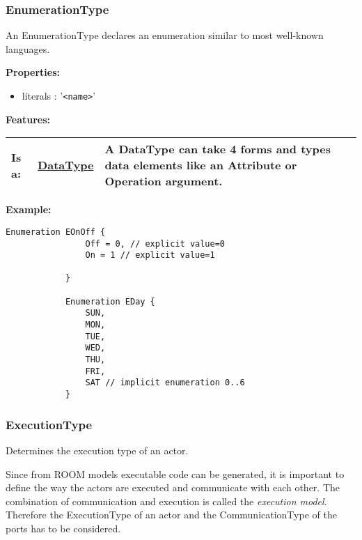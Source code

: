		
	\vspace{\baselineskip}
	\vspace{\baselineskip}
	\vspace{\baselineskip}
	
	\subsubsection{EnumerationType}
		\hypertarget{ref:EnumerationType}{}
		
		An EnumerationType declares an enumeration similar to most well-known languages.
		
		
		\textbf{Properties:}
		\begin{itemize}
		\item literals : '\verb|<name>|'
		\end{itemize}
		
		\begingroup
		\textbf{Features:}
		\renewcommand{\arraystretch}{1.8} %
		\begin{longtable}{l|l p{}}
			\hline
		Is a: & \tabitem \hyperlink{ref:DataType}{DataType}  & A DataType can take 4 forms and types data elements like an Attribute or Operation argument.\\
		\hline
		\end{longtable}
		\endgroup
		
		
		\textbf{Example:}
		
			\begin{lstlisting}[language=ROOM]
			Enumeration EOnOff {
				Off = 0, // explicit value=0
				On = 1 // explicit value=1 
			
			}
			
			Enumeration EDay {
				SUN,
				MON,
				TUE,
				WED,
				THU,
				FRI,
				SAT // implicit enumeration 0..6
			}
			\end{lstlisting}
	
	\vspace{\baselineskip}
	\vspace{\baselineskip}
	\vspace{\baselineskip}
	
	\subsubsection{ExecutionType}
		\hypertarget{ref:ExecutionType}{}
		
		Determines the execution type of an actor.
		
		Since from ROOM models executable code can be generated, it is important to define the way the actors are 
		executed and communicate with each other. The combination of communication and execution is called the 
		\emph{execution model}. Therefore the ExecutionType of an actor and the CommunicationType of the ports has to be considered.
		
